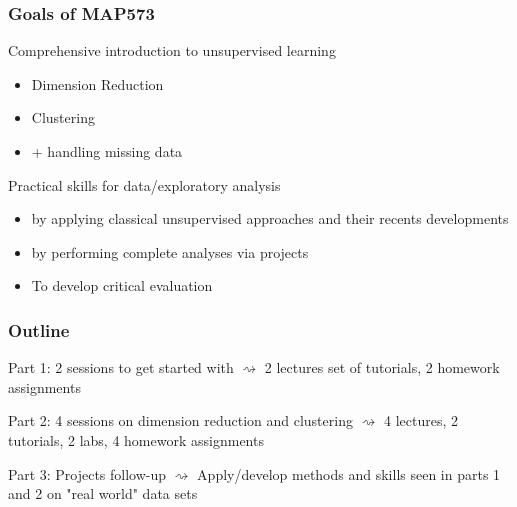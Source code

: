 \documentclass{beamer}\usepackage[]{graphicx}\usepackage[]{color}
\begin{document}
\begin{frame}
  \frametitle{Goals of MAP573}

  \begin{block}{Comprehensive introduction to unsupervised learning}  
    \begin{itemize}  
      \item Dimension Reduction
      \item Clustering
      \item + handling missing data
    \end{itemize}
  \end{block}

  \vfill
  
  \begin{block}{Practical skills for data/exploratory analysis}
      \begin{itemize}  
        \item by applying classical unsupervised approaches and their recents developments
        \item by performing complete analyses via projects
        \item To develop critical evaluation
      \end{itemize}
  \end{block}

\end{frame}

\begin{frame}
  \frametitle{Outline}
  
  \begin{block}{Part 1: 2 sessions to get started with }
    $\rightsquigarrow$ 2 lectures set of tutorials, 2 homework assignments
  \end{block}

  \vfill

  \begin{block}{Part 2: 4 sessions on dimension reduction and clustering}
    $\rightsquigarrow$ 4 lectures, 2 tutorials, 2 labs, 4 homework assignments
  \end{block}

  \vfill

  \begin{block}{Part 3: Projects follow-up}
    $\rightsquigarrow$ Apply/develop methods and skills seen in parts 1 and 2 on "real world" data sets
  \end{block}


\end{frame}
\end{document}
